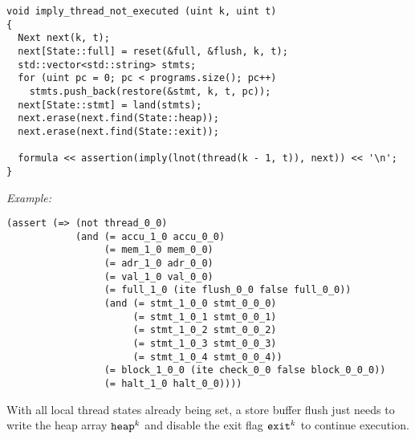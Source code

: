\begin{lstlisting}[style=c++]
void imply_thread_not_executed (uint k, uint t)
{
  Next next(k, t);
  next[State::full] = reset(&full, &flush, k, t);
  std::vector<std::string> stmts;
  for (uint pc = 0; pc < programs.size(); pc++)
    stmts.push_back(restore(&stmt, k, t, pc));
  next[State::stmt] = land(stmts);
  next.erase(next.find(State::heap));
  next.erase(next.find(State::exit));

  formula << assertion(imply(lnot(thread(k - 1, t)), next)) << '\n';
}
\end{lstlisting}

\noindent
\emph{Example:} 

\begin{lstlisting}[style=smtlib]
(assert (=> (not thread_0_0)
            (and (= accu_1_0 accu_0_0)
                 (= mem_1_0 mem_0_0)
                 (= adr_1_0 adr_0_0)
                 (= val_1_0 val_0_0)
                 (= full_1_0 (ite flush_0_0 false full_0_0))
                 (and (= stmt_1_0_0 stmt_0_0_0)
                      (= stmt_1_0_1 stmt_0_0_1)
                      (= stmt_1_0_2 stmt_0_0_2)
                      (= stmt_1_0_3 stmt_0_0_3)
                      (= stmt_1_0_4 stmt_0_0_4))
                 (= block_1_0_0 (ite check_0_0 false block_0_0_0))
                 (= halt_1_0 halt_0_0))))
\end{lstlisting}


\newpage

\noindent
With all local thread states already being set,
a store buffer flush
just needs to write the heap array $\texttt{heap}^k$ and disable the exit flag $\texttt{exit}^k$ to continue execution.

